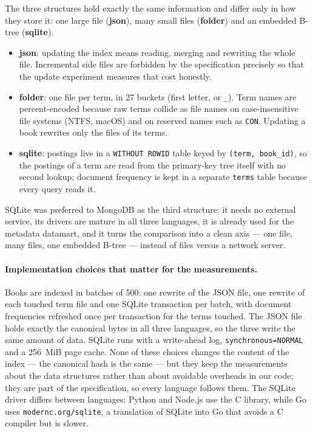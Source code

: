 \documentclass[12pt,a4paper]{article}
\begin{document}
	The three structures hold exactly the same information and differ only in how they
	store it: one large file (\textbf{json}), many small files (\textbf{folder}) and an
	embedded B-tree (\textbf{sqlite}).
	\begin{itemize}
		\item \textbf{json}: updating the index means reading, merging and rewriting the whole
		file. Incremental side files are forbidden by the specification precisely so that
		the update experiment measures that cost honestly.
		\item \textbf{folder}: one file per term, in 27 buckets (first letter, or \texttt{\_}).
		Term names are percent-encoded because raw terms collide as file names on
		case-insensitive file systems (NTFS, macOS) and on reserved names such as
		\texttt{CON}. Updating a book rewrites only the files of its terms.
		\item \textbf{sqlite}: postings live in a \texttt{WITHOUT ROWID} table keyed by
		\texttt{(term, book\_id)}, so the postings of a term are read from the primary-key
		tree itself with no second lookup; document frequency is kept in a separate
		\texttt{terms} table because every query reads it.
	\end{itemize}

	SQLite was preferred to MongoDB as the third structure: it needs no external service,
	its drivers are mature in all three languages, it is already used for the metadata
	datamart, and it turns the comparison into a clean axis --- one file, many files, one
	embedded B-tree --- instead of files versus a network server.

	\paragraph{Implementation choices that matter for the measurements.}
	Books are indexed in batches of 500: one rewrite of the JSON file, one rewrite of each
	touched term file and one SQLite transaction per batch, with document frequencies
	refreshed once per transaction for the terms touched. The JSON file holds exactly the
	canonical bytes in all three languages, so the three write the same amount of data.
	SQLite runs with a write-ahead log, \texttt{synchronous=NORMAL} and a 256~MiB page
	cache. None of these choices changes the content of the index --- the canonical hash is
	the same --- but they keep the measurements about the data structures rather than about
	avoidable overheads in our code; they are part of the specification, so every language
	follows them. The SQLite driver differs between languages: Python and Node.js use the C
	library, while Go uses \texttt{modernc.org/sqlite}, a translation of SQLite into Go that
	avoids a C compiler but is slower.
\end{document}
